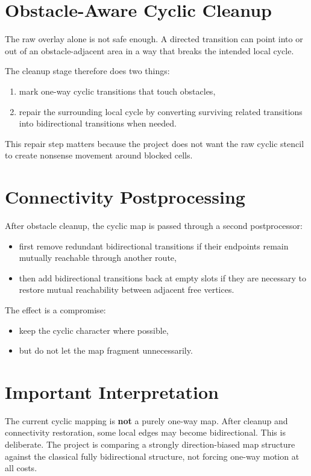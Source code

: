 \documentclass[11pt]{article}
\begin{document}
\section{Obstacle-Aware Cyclic Cleanup}

The raw overlay alone is not safe enough. A directed transition can point into or out of an obstacle-adjacent area in a way that breaks the intended local cycle.

The cleanup stage therefore does two things:
\begin{enumerate}[leftmargin=2em]
    \item mark one-way cyclic transitions that touch obstacles,
    \item repair the surrounding local cycle by converting surviving related transitions into bidirectional transitions when needed.
\end{enumerate}

This repair step matters because the project does not want the raw cyclic stencil to create nonsense movement around blocked cells.

\section{Connectivity Postprocessing}

After obstacle cleanup, the cyclic map is passed through a second postprocessor:
\begin{itemize}[leftmargin=2em]
    \item first remove redundant bidirectional transitions if their endpoints remain mutually reachable through another route,
    \item then add bidirectional transitions back at empty slots if they are necessary to restore mutual reachability between adjacent free vertices.
\end{itemize}

The effect is a compromise:
\begin{itemize}[leftmargin=2em]
    \item keep the cyclic character where possible,
    \item but do not let the map fragment unnecessarily.
\end{itemize}

\section{Important Interpretation}

The current cyclic mapping is \textbf{not} a purely one-way map. After cleanup and connectivity restoration, some local edges may become bidirectional. This is deliberate. The project is comparing a strongly direction-biased map structure against the classical fully bidirectional structure, not forcing one-way motion at all costs.
\end{document}
